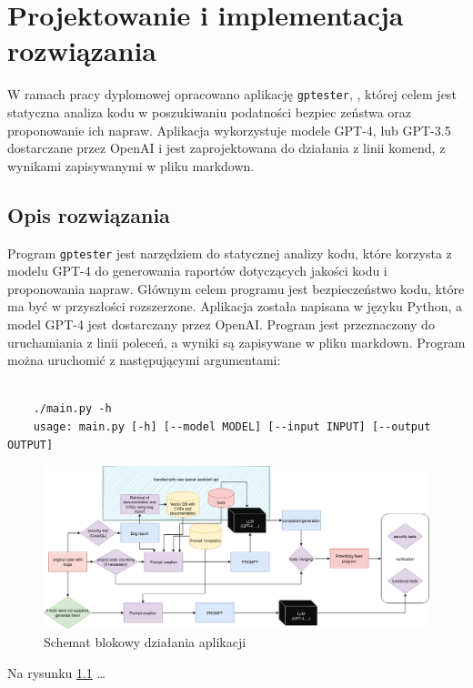 
\chapter{Projektowanie i implementacja rozwiązania}

W ramach pracy dyplomowej opracowano aplikację \texttt{gptester}, , której celem jest statyczna analiza kodu w poszukiwaniu podatności bezpiec
zeństwa oraz proponowanie ich napraw. Aplikacja wykorzystuje modele GPT-4, lub GPT-3.5 dostarczane przez OpenAI i jest zaprojektowana do działania z linii komend, z wynikami zapisywanymi w pliku markdown.

\section{Opis rozwiązania}

Program \texttt{gptester}
jest narzędziem do statycznej analizy kodu, które korzysta z modelu GPT-4 do generowania raportów dotyczących jakości kodu i proponowania napraw. Głównym celem programu jest bezpieczeństwo kodu, które ma być w przyszłości rozszerzone. Aplikacja została napisana w języku Python, a model GPT-4 jest dostarczany przez OpenAI. Program jest przeznaczony do uruchamiania z linii poleceń, a wyniki są zapisywane w pliku markdown. Program można uruchomić z następującymi argumentami:

\begin{verbatim}

    ./main.py -h
    usage: main.py [-h] [--model MODEL] [--input INPUT] [--output OUTPUT]
\end{verbatim}

\begin{figure}
    \centering\includegraphics[width=.6\textwidth]{img/gptester.drawio.png}
    \caption{Schemat blokowy działania aplikacji}  \label{rys:schemat}
    \end{figure}
    
    Na rysunku \ref{rys:schemat} \dots